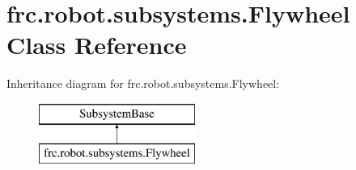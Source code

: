 \hypertarget{classfrc_1_1robot_1_1subsystems_1_1_flywheel}{}\section{frc.\+robot.\+subsystems.\+Flywheel Class Reference}
\label{classfrc_1_1robot_1_1subsystems_1_1_flywheel}
Inheritance diagram for frc.\+robot.\+subsystems.\+Flywheel\+:\begin{figure}[H]
\begin{center}
\leavevmode
\includegraphics[height=2.000000cm]{classfrc_1_1robot_1_1subsystems_1_1_flywheel}
\end{center}
\end{figure}
